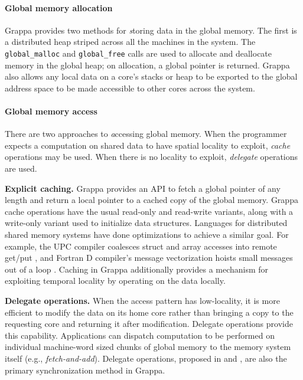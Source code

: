 \paragraph{Global memory allocation}
Grappa provides two methods for {\emph storing} data in the global memory. The
first is a distributed heap striped across all the machines in the
system. The \texttt{global\_malloc} and \texttt{global\_free} calls
are used to allocate and deallocate memory in the global heap; on
allocation, a global pointer is returned. Grappa also allows any local
data on a core's stacks or heap to be exported to the global address
space to be made accessible to other cores across the system.

\paragraph{Global memory access} There are two approaches to {\emph
accessing} global memory. When the programmer expects a computation on
shared data to have spatial locality to exploit, {\em cache} operations
may be used. When there is no locality to exploit, {\em delegate}
operations are used.

\textbf{Explicit caching.} Grappa provides an API to fetch a global
pointer of any length and return a local pointer to a cached copy of the
global memory.  Grappa cache operations have the usual read-only and
read-write variants, along with a write-only variant used to initialize
data structures. Languages for distributed shared memory systems have
done optimizations to achieve a similar goal. For example, the UPC
compiler coalesces struct and array accesses into remote get/put
\cite{Chen:2005}, and Fortran D compiler's message vectorization hoists
small messages out of a loop \cite{FortranD:1992}. Caching in Grappa
additionally provides a mechanism for exploiting temporal locality by
operating on the data locally. 

\textbf{Delegate operations.}
When the access pattern has low-locality, it is more efficient to modify
the data on its home core rather than bringing a copy to the requesting
core and returning it after modification. Delegate operations provide
this capability. Applications can dispatch computation to be performed
on individual machine-word sized chunks of global memory to the memory
system itself (e.g., \emph{fetch-and-add}).  Delegate operations,
proposed in \cite{Nelson:hotpar11} and \cite{delegated:oopsla11}, are also the primary synchronization method in Grappa.

